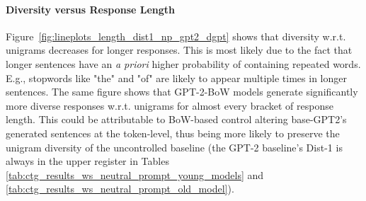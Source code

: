 
\paragraph{Diversity versus Response Length} Figure~\ref{fig:lineplots_length_dist1_np_gpt2_dgpt} shows that diversity w.r.t. unigrams decreases for longer responses. This is most likely due to the fact that longer sentences have an \textit{a priori} higher probability of containing repeated words. E.g., stopwords like "the" and "of" are likely to appear multiple times in longer sentences. The same figure shows that GPT-2-BoW models generate significantly more diverse responses w.r.t. unigrams for almost every bracket of response length. This could be attributable to BoW-based control altering base-GPT2's generated sentences at the token-level, thus being more likely to preserve the unigram diversity of the uncontrolled baseline (the GPT-2 baseline's Dist-1 is always in the upper register in Tables \ref{tab:ctg_results_ws_neutral_prompt_young_models} and \ref{tab:ctg_results_ws_neutral_prompt_old_model}).

